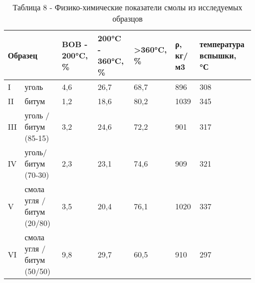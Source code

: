 \begin{table}[H]
\caption*{Таблица 8 - Физико-химические показатели смолы из исследуемых образцов}
\centering
\begin{tabular}{|ll|p{}|p{}|l|l|p{}|}
\hline
\multicolumn{2}{|l|}{Образец} & BOB - 200°C, \% & 200°C - 360°C, \% & \textgreater{}360°C, \% & ρ, кг/м3 & температура вспышки, °С \\ \hline
\multicolumn{1}{|l|}{I} & уголь & 4,6 & 26,7 & 68,7 & 896 & 308 \\ \hline
\multicolumn{1}{|l|}{II} & битум & 1,2 & 18,6 & 80,2 & 1039 & 345 \\ \hline
\multicolumn{1}{|l|}{III} & уголь / битум (85-15) & 3,2 & 24,6 & 72,2 & 901 & 317 \\ \hline
\multicolumn{1}{|l|}{IV} & уголь/ битум (70-30) & 2,3 & 23,1 & 74,6 & 909 & 321 \\ \hline
\multicolumn{1}{|l|}{V} & смола угля / битум (20/80) & 3,5 & 20,4 & 76,1 & 1020 & 337 \\ \hline
\multicolumn{1}{|l|}{VI} & смола угля / битум (50/50) & 9,8 & 29,7 & 60,5 & 910 & 297 \\ \hline
\end{tabular}
\end{table}

